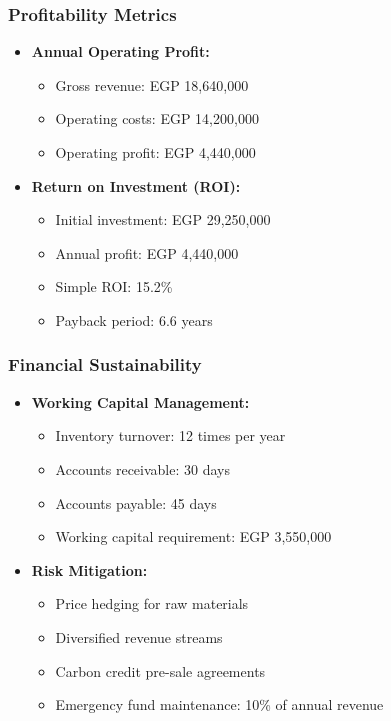 \subsubsection{Profitability Metrics}
\begin{itemize}
    \item \textbf{Annual Operating Profit:}
    \begin{itemize}
        \item Gross revenue: EGP 18,640,000
        \item Operating costs: EGP 14,200,000
        \item Operating profit: EGP 4,440,000
    \end{itemize}
    
    \item \textbf{Return on Investment (ROI):}
    \begin{itemize}
        \item Initial investment: EGP 29,250,000
        \item Annual profit: EGP 4,440,000
        \item Simple ROI: 15.2\%
        \item Payback period: 6.6 years
    \end{itemize}
\end{itemize}

\subsubsection{Financial Sustainability}
\begin{itemize}
    \item \textbf{Working Capital Management:}
    \begin{itemize}
        \item Inventory turnover: 12 times per year
        \item Accounts receivable: 30 days
        \item Accounts payable: 45 days
        \item Working capital requirement: EGP 3,550,000
    \end{itemize}
    
    \item \textbf{Risk Mitigation:}
    \begin{itemize}
        \item Price hedging for raw materials
        \item Diversified revenue streams
        \item Carbon credit pre-sale agreements
        \item Emergency fund maintenance: 10\% of annual revenue
    \end{itemize}
\end{itemize}

